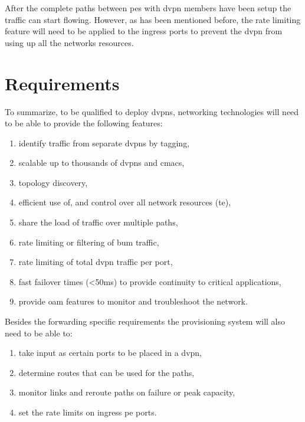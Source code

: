 After the complete paths between \acp{pe} with \ac{dvpn} members have been setup the traffic can start flowing. However, as has been mentioned before, the rate limiting feature will need to be applied to the ingress ports to prevent the \ac{dvpn} from using up all the networks resources. 



\section{Requirements} %
\label{sec:requirements}

To summarize, to be qualified to deploy \acp{dvpn}, networking technologies will need to be able to provide the following features:

\begin{enumerate}
	\item identify traffic from separate \acp{dvpn} by tagging, 
	\item scalable up to thousands of \acp{dvpn} and \acsp{cmac},
	\item topology discovery, 
	\item efficient use of, and control over all network resources (\ac{te}),
	\item share the load of traffic over multiple paths,
	\item rate limiting or filtering of \ac{bum} traffic,
	\item rate limiting of total \ac{dvpn} traffic per port,
	\item fast failover times (<50ms) to provide continuity to critical applications,
	\item provide \acl{oam} features to monitor and troubleshoot the network.
\end{enumerate}

Besides the forwarding specific requirements the provisioning system will also need to be able to:

\begin{enumerate}
	\item take input as certain ports to be placed in a \ac{dvpn},
	\item determine routes that can be used for the paths,
	\item monitor links and reroute paths on failure or peak capacity,
	\item set the rate limits on ingress \ac{pe} ports.
\end{enumerate}



